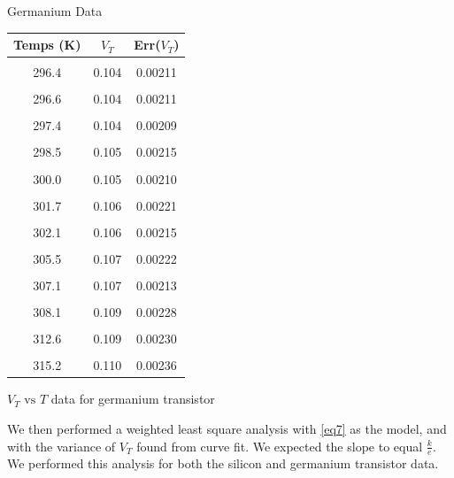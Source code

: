 \documentclass[12pt,letterpaper,twocolumn]{article}
\begin{document}
\begin {table}[H]
\caption*{Germanium Data}
{\footnotesize
\begin {center}
\begin {tabular} {|c | c | c| }
\hline
Temps (K) 			&    $V_T$		& Err($V_T$)\\
\hline&&\\
296.4 & 0.104 & 0.00211\\
\hline  && \\
296.6 & 0.104 & 0.00211\\
\hline  && \\
297.4 & 0.104 & 0.00209\\
\hline  && \\
298.5 & 0.105 & 0.00215\\
\hline  && \\
300.0 & 0.105 & 0.00210\\
\hline  && \\
301.7 & 0.106 & 0.00221\\
\hline  && \\
302.1 & 0.106 & 0.00215\\
\hline  && \\
305.5 & 0.107 & 0.00222 \\
\hline  && \\
307.1 & 0.107 & 0.00213 \\
\hline  && \\
308.1 & 0.109 & 0.00228\\
\hline  && \\
312.6 & 0.109 & 0.00230\\
\hline  && \\
315.2 & 0.110 & 0.00236\\
\hline%
\end {tabular}
\end {center}
}
\caption{\label{tab2} $V_T \text{ vs } T$ data for germanium transistor}
\end {table}

We then performed a weighted least square analysis with \ref{eq7} as the model, and with the variance of $V_T$ found from curve fit. We expected the slope to equal $\frac{k}{e}$. We performed this analysis for both the silicon and germanium transistor data. 
\end{document}
